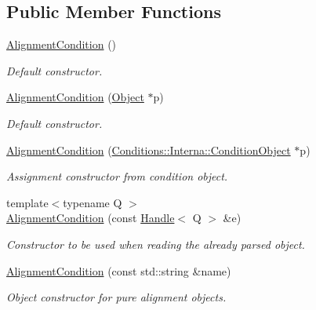 \subsection*{Public Member Functions}
\begin{DoxyCompactItemize}
\item 
\hyperlink{class_d_d4hep_1_1_alignments_1_1_alignment_condition_a47e83eec8de8934ae9787ecd328ce08e}{AlignmentCondition} ()
\begin{DoxyCompactList}\small\item\em Default constructor. \item\end{DoxyCompactList}\item 
\hyperlink{class_d_d4hep_1_1_alignments_1_1_alignment_condition_a39dcb2c2af405eef6cdf0c35bd159823}{AlignmentCondition} (\hyperlink{class_d_d4hep_1_1_alignments_1_1_interna_1_1_alignment_condition_object}{Object} $\ast$p)
\begin{DoxyCompactList}\small\item\em Default constructor. \item\end{DoxyCompactList}\item 
\hyperlink{class_d_d4hep_1_1_alignments_1_1_alignment_condition_a5bd168115013833363882f86fe7b8259}{AlignmentCondition} (\hyperlink{class_d_d4hep_1_1_conditions_1_1_interna_1_1_condition_object}{Conditions::Interna::ConditionObject} $\ast$p)
\begin{DoxyCompactList}\small\item\em Assignment constructor from condition object. \item\end{DoxyCompactList}\item 
{\footnotesize template$<$typename Q $>$ }\\\hyperlink{class_d_d4hep_1_1_alignments_1_1_alignment_condition_ab68255f67f7240febe0074888d428ee5}{AlignmentCondition} (const \hyperlink{class_d_d4hep_1_1_handle}{Handle}$<$ Q $>$ \&e)
\begin{DoxyCompactList}\small\item\em Constructor to be used when reading the already parsed object. \item\end{DoxyCompactList}\item 
\hyperlink{class_d_d4hep_1_1_alignments_1_1_alignment_condition_aac47c637a8b0c6f621e6c486244b21a2}{AlignmentCondition} (const std::string \&name)
\begin{DoxyCompactList}\small\item\em Object constructor for pure alignment objects. \item\end{DoxyCompactList}\item 

\end{DoxyCompactItemize}

